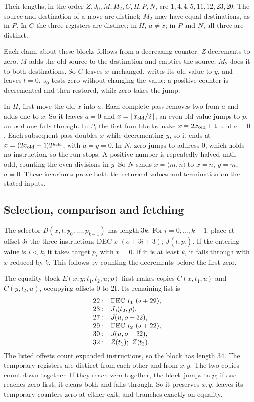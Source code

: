 \documentclass[11pt,twoside]{article}
\theoremstyle{thielethm}
\theoremstyle{thieledef}
\theoremstyle{thieledef}
\theoremstyle{thieledef}
\theoremstyle{thielethm}
\theoremstyle{thieleobs}
\theoremstyle{thielethm}
\begin{document}
Their lengths, in the order $Z,J_0,M,M_2,C,H,P,N$, are
$1,4,4,5,11,12,23,20$. The source and destination of a move are distinct;
$M_2$ may have equal destinations, as in $P$. In $C$ the three registers are distinct;
in $H$, $a\ne x$; in $P$ and $N$, all three are distinct.

Each claim about these blocks follows from a decreasing counter. $Z$ decrements to
zero. $M$ adds the old source to the destination and empties the source; $M_2$ does it
to both destinations. So $C$ leaves $x$ unchanged, writes its old value to
$y$, and leaves $t=0$. $J_0$ tests zero without changing the value: a positive
counter is decremented and then restored, while zero takes the jump.

In $H$, first move the old $x$ into $a$. Each complete pass removes two from $a$ and
adds one to $x$. So it leaves $a=0$ and $x=\lfloor x_{\rm old}/2\rfloor$;
an even old value jumps to $p$, an odd one falls through. In $P$, the first four
blocks make $x=2x_{\rm old}+1$ and $a=0$. Each subsequent pass doubles $x$ while
decrementing $y$, so it ends at $x=(2x_{\rm old}+1)2^{y_{\rm old}}$, with $a=y=0$.
In $N$, zero jumps to address 0, which holds no instruction, so the run stops. A positive number is repeatedly halved
until odd, counting the even divisions in $y$. So
$N$ sends $x=\langle m,n\rangle$ to $x=n$, $y=m$, $a=0$.
These invariants prove both the returned values and termination on the stated inputs.

\subsection{Selection, comparison and fetching}

The selector $D(x,t;p_0,\ldots,p_{k-1})$ has length $3k$.
For $i=0,\ldots,k-1$, place at offset $3i$ the three instructions
DEC $x$ $(o+3i+3)$; $J(t,p_i)$.
If the entering value is $i<k$, it takes target $p_i$ with $x=0$.
If it is at least $k$, it falls through with $x$ reduced by $k$.
This follows by counting the decrements before the first zero.

The equality block $E(x,y;t_1,t_2,u;p)$ first makes copies
$C(x,t_1,u)$ and $C(y,t_2,u)$, occupying offsets 0 to 21. Its remaining list is
\[
\begin{array}{r l}
22:&\mathrm{DEC}\ t_1\ (o+29),\\
23:&J_0(t_2,p),\\
27:&J(u,o+32),\\
29:&\mathrm{DEC}\ t_2\ (o+22),\\
30:&J(u,o+32),\\
32:&Z(t_1);\ Z(t_2).
\end{array}
\]
The listed offsets count expanded instructions, so the block has length 34.
The temporary registers are distinct from each other and from $x,y$.
The two copies count down together. If they reach zero together, the block jumps to
$p$; if one reaches zero first, it clears both and falls through. So it preserves
$x,y$, leaves its temporary counters zero at either exit, and branches exactly on equality.
\end{document}
